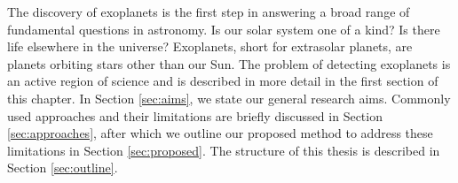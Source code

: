 

The discovery of exoplanets is the first step in answering a broad range of fundamental questions in astronomy. Is our solar system one of a kind? Is there life elsewhere in the universe? Exoplanets, short for extrasolar planets, are planets orbiting stars other than our Sun. The problem of detecting exoplanets is an active region of science and is described in more detail in the first section of this chapter. In Section \ref{sec:aims}, we state our general research aims. Commonly used approaches and their limitations are briefly discussed in Section \ref{sec:approaches}, after which we outline our proposed method to address these limitations in Section \ref{sec:proposed}. The structure of this thesis is described in Section \ref{sec:outline}.